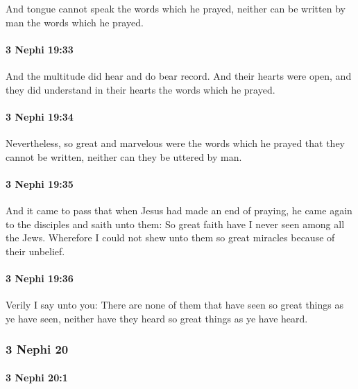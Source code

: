 			And tongue cannot speak the words which he prayed,
			neither can be written by man the words which he prayed.

		\paragraph{3 Nephi 19:33} %
			\label{3NEPHI-19-33}

			And the multitude did hear and do bear record.
			And their hearts were open,
			and they did understand in their hearts the words which he prayed.

		\paragraph{3 Nephi 19:34} %
			\label{3NEPHI-19-34}

			Nevertheless, so great and marvelous were the words which he prayed
			that they cannot be written, neither can they be uttered by man.	

		\paragraph{3 Nephi 19:35} %
			\label{3NEPHI-19-35}

			And it came to pass that when Jesus had made an end of praying,
			he came again to the disciples and saith unto them:
			So great faith have I never seen among all the Jews.
			Wherefore I could not shew unto them
			so great miracles because of their unbelief.

		\paragraph{3 Nephi 19:36} %
			\label{3NEPHI-19-36}

			Verily I say unto you:
			There are none of them that have seen so great things as ye have seen,
			neither have they heard so great things as ye have heard.

	\subsubsection{3 Nephi 20} %
		\label{3NEPHI-20}
		
		\paragraph{3 Nephi 20:1} %
			\label{3NEPHI-20-1}


